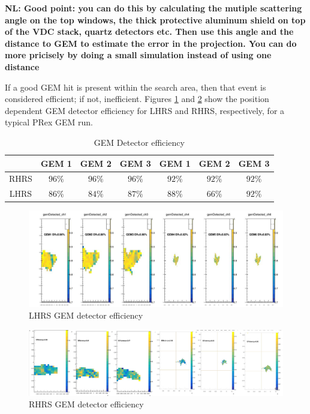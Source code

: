 {\bf NL: Good point: you can do this by calculating the mutiple scattering angle on the top windows, 
the thick protective aluminum shield on top of the VDC stack, quartz detectors etc. Then use this angle
 and the distance to GEM to estimate the error in the projection. You can do more pricisely by doing a 
small simulation instead of using one distance}

If a good GEM hit is present within the search area, then that event  is considered  efficient; if not,
 inefficient. Figures \ref{fig:lhrs_efficiency_2d} and \ref{fig:rhrs_efficiency_2d} show  the position 
dependent  GEM detector efficiency for LHRS and RHRS, respectively, for a typical PRex GEM run.

\begin{table}[]
    \centering
    \begin{tabular}{c|c|c|c|c|c|c} \hline
         ~ & GEM 1 & GEM 2 & GEM 3 & GEM 1 & GEM 2 & GEM 3 \\ \hline 
         RHRS & $96\%$ & $96\%$ & $96\%$ & $92\%$& $92\%$& $92\%$  \\ \hline
         LHRS & $86\%$& $84\%$ & $87\%$ & $88\%$ & $66\%$ & $92\%$ \\ \hline
    \end{tabular}
    \caption{GEM Detector efficiency}
    \label{tab:gem_detector_efficiency_table}
\end{table}

\begin{figure}[!htbp]
    \centering
    \includegraphics[width=\textwidth]{images/chap5/lhrs_efficiency_2d.png}
    \caption{LHRS GEM detector efficiency}
    \label{fig:lhrs_efficiency_2d}
\end{figure}

\begin{figure}[!htbp]
    \centering
    \includegraphics[width=\textwidth]{images/chap5/rhrs_efficiency_2d.png}
    \caption{RHRS GEM detector efficiency}
    \label{fig:rhrs_efficiency_2d}
\end{figure}

